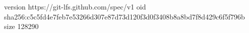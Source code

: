 version https://git-lfs.github.com/spec/v1
oid sha256:c5c5fd4e7feb7e53266d307e87d73d120f3d0f3408b8a8bd7f8d429c6f5f796b
size 128290
